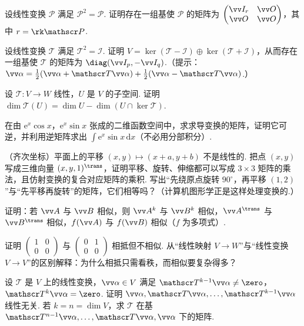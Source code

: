 {\begin{exB}
			\item\label{ex:lmap:B20} 设线性变换 $\mathscr P$ 满足 $\mathscr P^2=\mathscr P$. 证明存在一组基使 $\mathscr P$ 的矩阵为 $\begin{pmatrix}\vv I_r&\vv O\\ \vv O&\vv O\end{pmatrix}$，其中 $r=\rk\mathscr P$.
			\item\label{ex:lmap:B21} 设线性变换 $\mathscr T$ 满足 $\mathscr T^2=\mathscr I$. 证明 $V=\ker(\mathscr T-\mathscr I)\oplus\ker(\mathscr T+\mathscr I)$，从而存在一组基使 $\mathscr T$ 的矩阵为 $\diag(\vv I_p,-\vv I_q)$.（提示：$\vv\alpha=\frac12(\vv\alpha+\mathscr T\vv\alpha)+\frac12(\vv\alpha-\mathscr T\vv\alpha)$.）
			\item\label{ex:lmap:B22} 设 $\mathscr T:V\to W$ 线性，$U$ 是 $V$ 的子空间. 证明 $\dim\mathscr T(U)=\dim U-\dim(U\cap\ker\mathscr T)$.
			\item\label{ex:lmap:B23} 在由 $\mathrm e^x\cos x$，$\mathrm e^x\sin x$ 张成的二维函数空间中，求求导变换的矩阵，证明它可逆，并利用逆矩阵求出 $\int\mathrm e^x\sin x\,\mathrm dx$（不必用分部积分）.
			\item\label{ex:lmap:B24} （齐次坐标）平面上的平移 $(x,y)\mapsto(x+a,y+b)$ 不是线性的. 把点 $(x,y)$ 写成三维向量 $(x,y,1)^\trans$，证明平移、旋转、伸缩都可以写成 $3\times3$ 矩阵的乘法，且仿射变换的复合对应矩阵的乘积. 写出“先绕原点旋转 $90^\circ$，再平移 $(1,2)$”与“先平移再旋转”的矩阵，它们相等吗？（计算机图形学正是这样处理变换的.）
			\item\label{ex:lmap:B25} 证明：若 $\vv A$ 与 $\vv B$ 相似，则 $\vv A^k$ 与 $\vv B^k$ 相似，$\vv A^\trans$ 与 $\vv B^\trans$ 相似，$f(\vv A)$ 与 $f(\vv B)$ 相似（$f$ 为多项式）.
			\item\label{ex:lmap:B26} 证明 $\begin{pmatrix}1&0\\0&0\end{pmatrix}$ 与 $\begin{pmatrix}0&1\\0&0\end{pmatrix}$ 相抵但不相似. 从“线性映射 $V\to W$”与“线性变换 $V\to V$”的区别解释：为什么相抵只需看秩，而相似要复杂得多？
			\item\label{ex:lmap:B27} 设 $\mathscr T$ 是 $V$ 上的线性变换，$\vv\alpha\in V$ 满足 $\mathscr T^{k-1}\vv\alpha\ne\zero$，$\mathscr T^k\vv\alpha=\zero$. 证明 $\vv\alpha,\mathscr T\vv\alpha,\ldots,\mathscr T^{k-1}\vv\alpha$ 线性无关. 若 $k=n=\dim V$，求 $\mathscr T$ 在基 $\mathscr T^{n-1}\vv\alpha,\ldots,\mathscr T\vv\alpha,\vv\alpha$ 下的矩阵.
		\end{exB}
		
}
